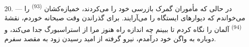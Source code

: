 20. --- در حالی که مأموران گمرک بازرسی خود را می‌کردند، خمیازه‌کشان
 \textsuperscript{(93)} را می‌خواندم که دیوارهای
ایستگاه را می‌آرایند. برای گذراندن وقت صبحانه خوردم، نقشهٔ
 \textsuperscript{(94)} آلمان را نگاه کردم تا ببینم چه
اندازه راه هنوز مرا از استراسبورگ جدا می‌کند، و دوباره به واگن خود
درآمدم، نیرو گرفته از امید رسیدن زود به مقصد سفرم.

\VUsaut{6.0mm}
\VUfilet{22mm}
